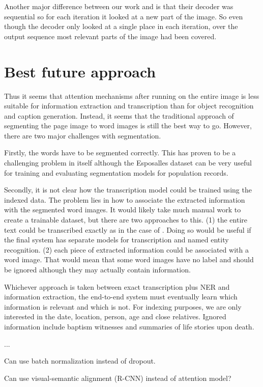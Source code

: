 Another major difference between our work and \cite{AttendAndTell} is that their decoder was sequential so for each iteration it looked at a new part of the image. So even though the decoder only looked at a single place in each iteration, over the output sequence most relevant parts of the image had been covered.


\section{Best future approach}

Thus it seems that attention mechanisms after running on the entire image is less suitable for information extraction and transcription than for object recognition and caption generation. Instead, it seems that the traditional approach of segmenting the page image to word images is still the best way to go. However, there are two major challenges with segmentation.

Firstly, the words have to be segmented correctly. This has proven to be a challenging problem in itself although the Esposalles dataset \cite{esposalles} can be very useful for training and evaluating segmentation models for population records.

Secondly, it is not clear how the transcription model could be trained using the indexed data. The problem lies in how to associate the extracted information with the segmented word images. It would likely take much manual work to create a trainable dataset, but there are two approaches to this. (1) the entire text could be transcribed exactly as in the case of \cite{esposalles}. Doing so would be useful if the final system has separate models for transcription and named entity recognition.
(2) each piece of extracted information could be associated with a word image. That would mean that some word images have no label and should be ignored although they may actually contain information.

Whichever approach is taken between exact transcription plus NER and information extraction, the end-to-end system must eventually learn which information is relevant and which is not.
For indexing purposes, we are only interested in the date, location, person, age and close relatives. Ignored information include baptism witnesses and summaries of life stories upon death.


...

Can use batch normalization instead of dropout.

Can use visual-semantic alignment (R-CNN) instead of attention model?
